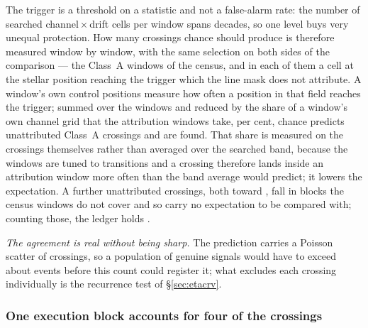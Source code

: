 The trigger is a threshold on a statistic and not a false-alarm rate: the
number of searched channel\,$\times$\,drift cells per window spans
\TuCellsDecades{} decades, so one level buys very unequal protection. How
many crossings chance should produce is therefore measured window by window,
with the same selection on both sides of the comparison --- the \NWinA{}
Class~A windows of the census, and in each of them a cell at the stellar
position reaching the trigger which the line mask does not attribute. A
window's own \NCtrl{} control positions measure how often a position in that
field reaches the trigger; summed over the windows and reduced by the
share of a window's own channel grid that the attribution windows take,
\CxOccPerWinPct{} per cent, chance predicts \StExpChance{} unattributed
Class~A crossings and \StObs{} are found. That share is measured on the
crossings themselves rather than averaged over the searched band, because
the windows are tuned to transitions and a crossing therefore lands inside
an attribution window more often than the band average would predict; it
lowers the expectation. A
further \StNOutsideWord{} unattributed crossings, both toward
\StOutsideStar, fall in blocks the census windows do not cover and so carry
no expectation to be compared with; counting those, the ledger holds
\ChnUnattrA.

\emph{The agreement is real without being sharp.} The prediction carries a
Poisson scatter of \StPois{} crossings, so a population of genuine signals
would have to exceed about \StFloor{} events before this count could register
it; what excludes each crossing individually is the recurrence test of
\S\ref{sec:etacrv}.

\subsubsection{One execution block accounts for four of the crossings}
\label{sec:bdblock}

